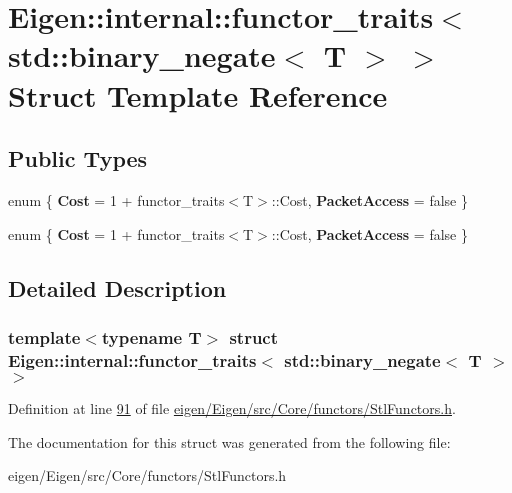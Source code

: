 \hypertarget{struct_eigen_1_1internal_1_1functor__traits_3_01std_1_1binary__negate_3_01_t_01_4_01_4}{}\section{Eigen\+:\+:internal\+:\+:functor\+\_\+traits$<$ std\+:\+:binary\+\_\+negate$<$ T $>$ $>$ Struct Template Reference}
\label{struct_eigen_1_1internal_1_1functor__traits_3_01std_1_1binary__negate_3_01_t_01_4_01_4}
\subsection*{Public Types}
\begin{DoxyCompactItemize}
\item 
\mbox{\label{struct_eigen_1_1internal_1_1functor__traits_3_01std_1_1binary__negate_3_01_t_01_4_01_4_a2ecc3cdff56d4e44d962c7e2dabe27a2}} 
enum \{ {\bfseries Cost} = 1 + functor\+\_\+traits$<$T$>$\+:\+:Cost, 
{\bfseries Packet\+Access} = false
 \}
\item 
\mbox{\label{struct_eigen_1_1internal_1_1functor__traits_3_01std_1_1binary__negate_3_01_t_01_4_01_4_ae6a6f3306d152d18921838ab14c036d3}} 
enum \{ {\bfseries Cost} = 1 + functor\+\_\+traits$<$T$>$\+:\+:Cost, 
{\bfseries Packet\+Access} = false
 \}
\end{DoxyCompactItemize}


\subsection{Detailed Description}
\subsubsection*{template$<$typename T$>$\newline
struct Eigen\+::internal\+::functor\+\_\+traits$<$ std\+::binary\+\_\+negate$<$ T $>$ $>$}



Definition at line \hyperlink{eigen_2_eigen_2src_2_core_2functors_2_stl_functors_8h_source_l00091}{91} of file \hyperlink{eigen_2_eigen_2src_2_core_2functors_2_stl_functors_8h_source}{eigen/\+Eigen/src/\+Core/functors/\+Stl\+Functors.\+h}.



The documentation for this struct was generated from the following file\+:\begin{DoxyCompactItemize}
\item 
eigen/\+Eigen/src/\+Core/functors/\+Stl\+Functors.\+h\end{DoxyCompactItemize}
